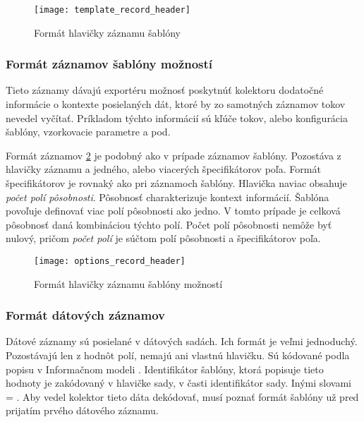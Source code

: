 \begin{figure}[ht!]
\centering
\texttt{[image: template\_record\_header]}
\caption{Formát hlavičky záznamu šablóny}\label{o:template_record_header}
\end{figure}

\subsubsection{Formát záznamov šablóny možností}

Tieto záznamy dávajú exportéru možnosť poskytnúť kolektoru dodatočné informácie o kontexte posielaných dát, 
ktoré by zo samotných 
záznamov tokov nevedel vyčítať. Príkladom týchto informácií sú kľúče tokov, alebo konfigurácia šablóny,
vzorkovacie parametre a pod.

Formát záznamov \ref{o:options_record_header} je podobný ako v prípade záznamov šablóny. Pozostáva z hlavičky záznamu 
a jedného, alebo viacerých špecifikátorov poľa. Formát špecifikátorov je rovnaký ako pri záznamoch šablóny.
Hlavička naviac obsahuje \emph{počet polí pôsobnosti}. Pôsobnosť charakterizuje kontext 
informácií. Šablóna povoľuje 
definovať viac polí pôsobnosti ako jedno. V tomto prípade je celková pôsobnosť daná kombináciou týchto polí.
Počet polí pôsobnosti nemôže byť nulový, pričom \emph{počet polí} je 
súčtom polí pôsobnosti a špecifikátorov poľa.

\begin{figure}[ht!]
\centering
\texttt{[image: options\_record\_header]}
\caption{Formát hlavičky záznamu šablóny možností}\label{o:options_record_header}
\end{figure}

\subsubsection{Formát dátových záznamov}

Dátové záznamy sú posielané v dátových sadách. Ich formát je veľmi 
jednoduchý. Pozostávajú len z hodnôt polí, nemajú ani vlastnú hlavičku. 
Sú kódované podla popisu v Informačnom modeli \citep{rfc5102}. Identifikátor 
šablóny, ktorá popisuje tieto hodnoty je zakódovaný v hlavičke sady, v časti
identifikátor sady. Inými slovami  = . Aby vedel kolektor tieto dáta dekódovať, musí poznať formát šablóny 
už pred prijatím prvého dátového záznamu.
